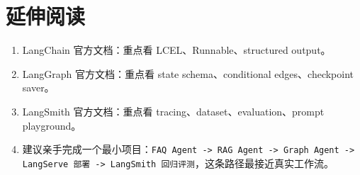 \section{延伸阅读}

\begin{enumerate}[leftmargin=2em]
\item LangChain 官方文档：重点看 LCEL、Runnable、structured output。
\item LangGraph 官方文档：重点看 state schema、conditional edges、checkpoint saver。
\item LangSmith 官方文档：重点看 tracing、dataset、evaluation、prompt playground。
\item 建议亲手完成一个最小项目：\texttt{FAQ Agent -> RAG Agent -> Graph Agent -> LangServe 部署 -> LangSmith 回归评测}，这条路径最接近真实工作流。
\end{enumerate}
